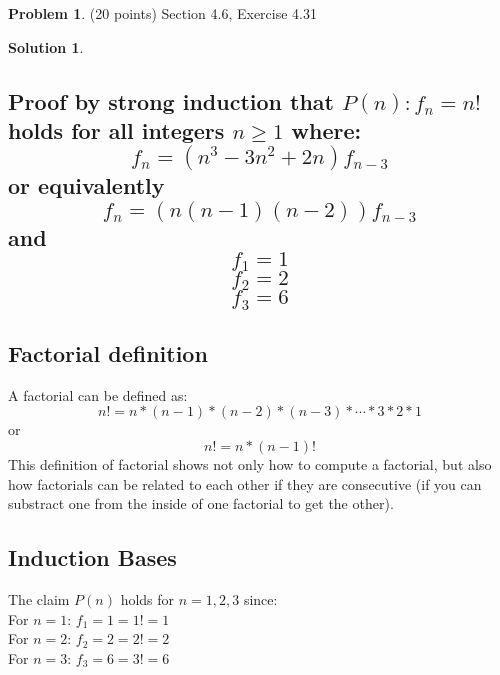 \documentclass{article}
\theoremstyle{definition}
\newtheorem{problem}{Problem}
\newtheorem*{solution}{Solution}
\begin{document}
\newpage
\begin{problem} (20 points) Section 4.6, Exercise 4.31
\end{problem}
\begin{solution}
\hspace{1cm}
\subsection*{Proof by strong induction that $P(n): f_n = n!$ holds for all integers $n \geqslant 1$ where:\\
$$f_n = (n^3-3n^2+2n)f_{n-3}$$ or equivalently
$$ f_n = (n(n-1)(n-2))f_{n-3} $$
and
$$ f_1 = 1 $$
$$ f_2 = 2 $$
$$ f_3 = 6 $$}
\subsection*{Factorial definition}
A factorial can be defined as:\\
$$ n! = n * (n-1) * (n-2) * (n-3) * \cdots * 3 * 2 * 1$$ or
$$ n! = n * (n-1)! $$
This definition of factorial shows not only how to compute a factorial, but also how factorials can be related to each other if they are consecutive (if you can substract one from the inside of one factorial to get the other).
\subsection*{Induction Bases}
The claim $P(n)$ holds for $n = 1, 2, 3$ since:\\
For $n = 1$: $f_1 = 1 = 1! = 1$\\
For $n = 2$: $f_2 = 2 = 2! = 2$\\
For $n = 3$: $f_3 = 6 = 3! = 6$

\end{solution}
\end{document}
